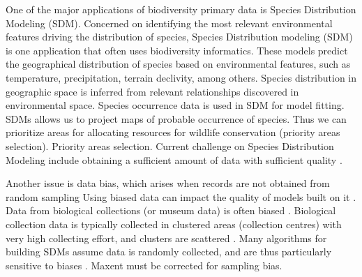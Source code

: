 One of the major applications of biodiversity primary data is Species Distribution Modeling (SDM).
Concerned on identifying the most relevant environmental features driving the distribution of species, Species Distribution modeling (SDM) is one application that often uses biodiversity informatics.
These models predict the geographical distribution of species based on environmental features, such as temperature, precipitation, terrain declivity, among others.
Species distribution in geographic space is inferred from relevant relationships discovered in environmental space.
Species occurrence data is used in SDM for model fitting. 
SDMs allows us to project maps of probable occurrence of species.
Thus we can prioritize areas for allocating resources for wildlife conservation (priority areas selection).
Priority areas selection. %
Current challenge on Species Distribution Modeling include obtaining a sufficient amount of data with sufficient quality \cite{Araujo2006}.










Another issue is data bias, which arises when records are not obtained from random sampling \cite{Daru2017}
Using biased data can impact the quality of models built on it \cite{Newbold2010}.
Data from biological collections (or museum data) is often biased \cite{Daru2017}.
Biological collection data is typically collected in clustered areas (collection centres) with very high collecting effort, and clusters are scattered \cite{Nelson1990, VanGemerden2005}.
Many algorithms for building SDMs assume data is randomly collected, and are thus particularly sensitive to biases \cite{Araujo2016} .
Maxent must be corrected for sampling bias.%


